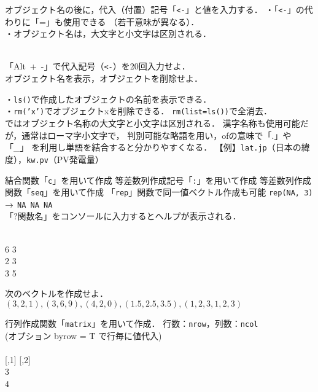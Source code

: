 {
  {
    オブジェクト名の後に，代入（付置）記号「\texttt{<-}」と値を入力する．
  }
  ・「\texttt{<-}」の代わりに「=」も使用できる （若干意味が異なる）．\\
  ・オブジェクト名は，大文字と小文字は区別される．
  \MyCols
  {
    \MyConsole
    {
      \\
    }
  }
  {
    \MyConsole
    {
       \\
       
    }
  }

  \MyExercise
  {
    「Alt~+~-」で代入記号（\texttt{<-}）を20回入力せよ．\\
    オブジェクト名を表示，オブジェクトを削除せよ．
  }
}
\note
{
  ・\texttt{ls()}で作成したオブジェクトの名前を表示できる．\\
  ・\texttt{rm('x')}でオブジェクトxを削除できる． 
  \texttt{rm(list=ls())}で全消去．\\
  \R ではオブジェクト名称の大文字と小文字は区別される．
  漢字名称も使用可能だが，通常はローマ字小文字で，
  判別可能な略語を用い，ofの意味で「.」や「\_」
  を利用し単語を結合すると分かりやすくなる．
  【例】\texttt{lat.jp}（日本の緯度），\texttt{kw.pv}（PV発電量）
}

{
  \MyColsThree
  {
    {結合関数「\texttt{c}」を用いて作成}
  }
  {
    {等差数列作成記号「\texttt{:}」を用いて作成}
  }
  {
    {等差数列作成関数「\texttt{seq}」を用いて作成}
  }
  「\texttt{rep}」関数で同一値ベクトル作成も可能
  \texttt{rep(NA, 3)} $\rightarrow$ \texttt{NA NA NA}\\
  「?関数名」をコンソールに入力するとヘルプが表示される．

  \MyColsThree
  {
    \MyConsole
    {
      \\  6 3
    }
  }
  {
    \MyConsole
    {
      \\  2 3
    }
  }
  {
    \MyConsole
    {
      \\  3 5
    }
  }
}

{
  \MyExercise
  {
    次のベクトルを作成せよ．
    $(3, 2, 1),(3, 6, 9),(4, 2, 0),(1.5, 2.5, 3.5),(1, 2, 3, 1, 2, 3)$
  }
}

{
  {
    行列作成関数「\texttt{matrix}」を用いて作成．
    行数：\texttt{nrow}，列数：\texttt{ncol}
  }
  \MyConsole
  {
    \\
    \hfill (オプション byrow = T で行毎に値代入)\\
    \\
    \relax
    \hspace{3mm}[,1] [,2]\\     3\\     4
  }
}

